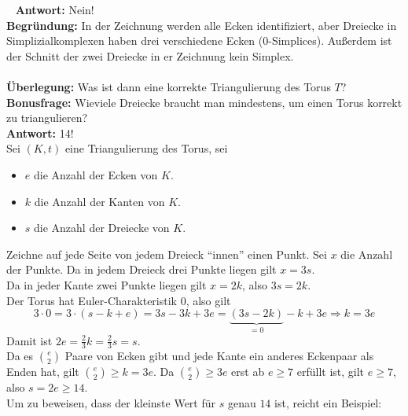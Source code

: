 \begin{solution}
  \
  \textbf{Antwort:} Nein! \\
  \textbf{Begründung:} In der Zeichnung werden alle Ecken identifiziert, aber Dreiecke in Simplizialkomplexen haben drei verschiedene Ecken (0-Simplices). Außerdem ist der Schnitt der zwei Dreiecke in er Zeichnung kein Simplex. \\
  \\
  \textbf{Überlegung:} Was ist dann eine korrekte Triangulierung des Torus \( T \)? \\
  
  \textbf{Bonusfrage:} Wieviele Dreiecke braucht man mindestens, um einen Torus korrekt zu triangulieren? \\
  \textbf{Antwort:} 14! \\
  Sei \( (K,t) \) eine Triangulierung des Torus, sei 
  \begin{itemize}
    \item \( e \) die Anzahl der Ecken von \( K \).
    \item \( k \) die Anzahl der Kanten von \( K \).
    \item \( s \) die Anzahl der Dreiecke von \( K \).
  \end{itemize} 
  Zeichne auf jede Seite von jedem Dreieck ``innen'' einen Punkt. Sei \( x \) die Anzahl der Punkte.
  Da in jedem Dreieck drei Punkte liegen gilt \( x = 3s \). \\
  Da in jeder Kante zwei Punkte liegen gilt \( x = 2k \), also \( 3s = 2k \). \\
  Der Torus hat Euler-Charakteristik \( 0 \), also gilt
  \begin{equation*}
    3 \cdot 0 = 3 \cdot (s - k + e) = 3s - 3k +3e = \underbrace{(3s -2k)}_{= 0} - k + 3e \Rightarrow k = 3e
  \end{equation*}
  Damit ist \( 2e = \frac{2}{3} k = \frac{2}{3} s = s \). \\
  
  Da es \( \binom{e}{2} \) Paare von Ecken gibt und jede Kante ein anderes Eckenpaar als Enden hat, gilt \( \binom{e}{2} \geq k = 3e \). Da \( \binom{e}{2} \geq 3e \) erst ab \( e \geq 7 \) erfüllt ist, gilt \( e \geq 7 \), also \( s = 2e \geq 14 \). \\
  Um zu beweisen, dass der kleinste Wert für \( s \) genau \( 14 \) ist, reicht ein Beispiel: 
  
\end{solution}

